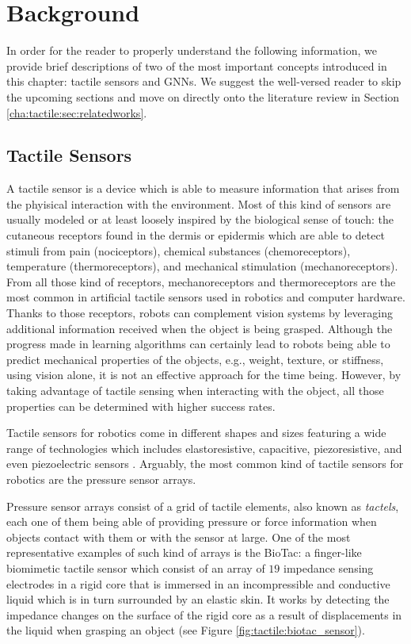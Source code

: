 \clearpage

\section{Background}
\label{cha:tactile:sec:background}

In order for the reader to properly understand the following information, we provide brief descriptions of two of the most important concepts introduced in this chapter: tactile sensors and \aclp{GNN}. We suggest the well-versed reader to skip the upcoming sections and move on directly onto the literature review in Section \ref{cha:tactile:sec:relatedworks}.

\subsection{Tactile Sensors}

A tactile sensor is a device which is able to measure information that arises from the phyisical interaction with the environment. Most of this kind of sensors are usually modeled or at least loosely inspired by the biological sense of touch: the cutaneous receptors found in the dermis or epidermis which are able to detect stimuli from pain (nociceptors), chemical substances (chemoreceptors), temperature (thermoreceptors), and mechanical stimulation (mechanoreceptors). From all those kind of receptors, mechanoreceptors and thermoreceptors are the most common in artificial tactile sensors used in robotics and computer hardware. Thanks to those receptors, robots can complement vision systems by leveraging additional information received when the object is being grasped. Although the progress made in learning algorithms can certainly lead to robots being able to predict mechanical properties of the objects, e.g., weight, texture, or stiffness, using vision alone, it is not an effective approach for the time being. However, by taking advantage of tactile sensing when interacting with the object, all those properties can be determined with higher success rates.

Tactile sensors for robotics come in different shapes and sizes featuring a wide range of technologies which includes elastoresistive, capacitive, piezoresistive, and even piezoelectric sensors \cite{Dahiya2012}. Arguably, the most common kind of tactile sensors for robotics are the pressure sensor arrays.

Pressure sensor arrays consist of a grid of tactile elements, also known as \emph{tactels}, each one of them being able of providing pressure or force information when objects contact with them or with the sensor at large. One of the most representative examples of such kind of arrays is the BioTac: a finger-like biomimetic tactile sensor which consist of an array of $19$ impedance sensing electrodes in a rigid core that is immersed in an incompressible and conductive liquid which is in turn surrounded by an elastic skin. It works by detecting the impedance changes on the surface of the rigid core as a result of displacements in the liquid when grasping an object (see Figure \ref{fig:tactile:biotac_sensor}).

